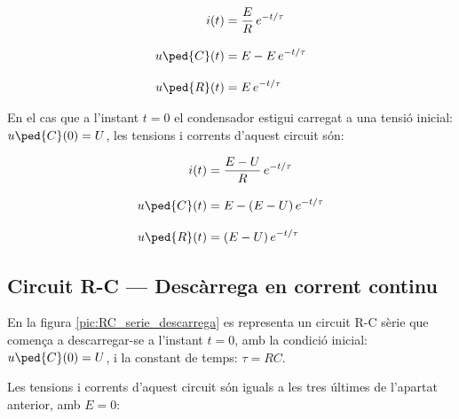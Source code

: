 \hfill
\begin{minipage}[b]{9cm}
    
\end{minipage}
\hfill
\begin{minipage}[b]{6cm}
    \begin{align}
        i(t) &= \frac{E}{R}\,e^{-t/\tau}\label{eq:RC-carrega} \\[3mm]
        u\ped{C}(t) &= E  - E\, e^{-t/\tau}  \\[3mm]
        u\ped{R}(t) &= E\,e^{-t/\tau}
    \end{align}
\end{minipage}

\vspace{5mm}
En el cas que a l'instant $t=0$ el condensador  estigui carregat a una tensió inicial: $u\ped{C}(0) = U$, les tensions i corrents d'aquest circuit són:

\hfill
\begin{minipage}[b]{9cm}
    
\end{minipage}
\hfill
\begin{minipage}[b]{6cm}
    \begin{align}
        i(t) &= \frac{E-U}{R}\,e^{-t/\tau} \\[3mm]
        u\ped{C}(t) &= E  - (E-U) \,e^{-t/\tau}  \\[3mm]
        u\ped{R}(t) &= (E-U)\,e^{-t/\tau}
    \end{align}
\end{minipage}


\subsection{Circuit R-C --- Descàrrega en corrent continu}\label{sec:RC-descarrega}

En la figura \vref{pic:RC_serie_descarrega} es representa un circuit R-C sèrie que comença a descarregar-se a l'instant $t=0$, amb la condició inicial: $u\ped{C}(0) = U$, i la constant de temps: $\tau = R C$.
\begin{center}
    
    \label{pic:RC_serie_descarrega}
\end{center}

Les tensions i corrents d'aquest circuit són iguals a les tres últimes de l'apartat anterior, amb $E=0$:

